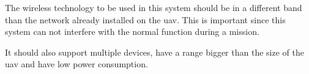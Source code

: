 The wireless technology to be used in this system should be in a different band than the network already installed on the \gls{uav}.
This is important since this system can not interfere with the normal function during a mission.

It should also support multiple devices, have a range bigger than the size of the \gls{uav} and have low power consumption.








